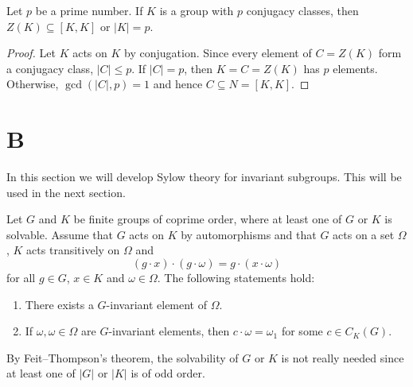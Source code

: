 \begin{corollary}
  Let $p$ be a prime number. If $K$ is a group with $p$ conjugacy classes, then 
  $Z(K)\subseteq[K,K]$ or $|K|=p$. 
\end{corollary}

\begin{proof}
  Let $K$ acts on $K$ by conjugation. Since every element of $C=Z(K)$
  form a conjugacy class, $|C|\leq p$. If $|C|=p$, then $K=C=Z(K)$
  has $p$ elements. Otherwise, $\gcd(|C|,p)=1$ and hence $C\subseteq
  N=[K,K]$.
\end{proof}


\section*{B}

In this section we will develop Sylow theory for invariant subgroups. This will be used
in the next section. 

\begin{lemma}[Glauberman]
	Let $G$ and $K$ be finite groups of coprime order, where at least one of $G$ or $K$ is solvable. 
	Assume that $G$ acts on $K$ by automorphisms and that
	$G$ acts on a set $\Omega$,
	$K$ acts transitively on $\Omega$ and  
	\[
	(g\cdot x)\cdot (g\cdot\omega)=g\cdot (x\cdot\omega)
	\]
	for all $g\in G$, $x\in K$ and $\omega\in\Omega$. 
	The following statements hold:
	\begin{enumerate}
	\item There exists a $G$-invariant element of $\Omega$.
	\item If $\omega,\omega\in\Omega$ are $G$-invariant elements, then 
	$c\cdot\omega=\omega_1$ for some $c\in C_K(G)$. 
	\end{enumerate}
\end{lemma}

By Feit--Thompson's theorem, the solvability of $G$ or $K$ is not really needed 
since at least one of $|G|$ or $|K|$ is of odd order. 

